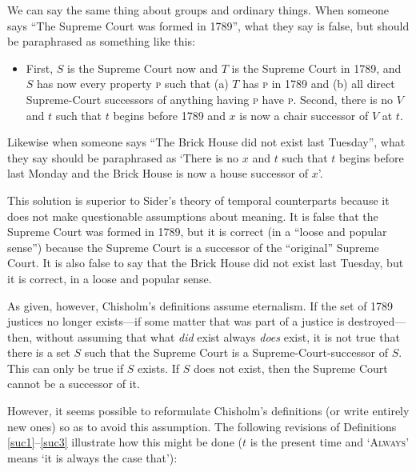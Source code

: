 \documentclass[12pt,twoside]{reedfancy}
\begin{document}
\begin{spacing}{1.25}
We can say the same thing about groups and ordinary things.  When
someone says ``The Supreme Court was formed in 1789'', what they say
is false, but should be paraphrased as something like this:

\begin{itemize}
  \item First, $S$ is the Supreme Court now and $T$ is the Supreme
    Court in 1789, and $S$ has now every property \textsc{p} such that
    (a) $T$ has \textsc{p} in 1789 and (b) all direct Supreme-Court
    successors of anything having \textsc{p} have \textsc{p}.  Second,
    there is no $V$ and $t$ such that $t$ begins before 1789 and $x$
    is now a chair successor of $V$ at $t$.
\end{itemize}

Likewise when someone says ``The Brick House did not exist last
Tuesday'', what they say should be paraphrased as `There is no $x$ and
$t$ such that $t$ begins before last Monday and the Brick House is now
a house successor of $x$'.

This solution is superior to Sider's theory of temporal counterparts
because it does not make questionable assumptions about meaning.  It
is false that the Supreme Court was formed in 1789, but it is correct
(in a ``loose and popular sense'') because the Supreme Court is a
successor of the ``original'' Supreme Court.  It is also false to say
that the Brick House did not exist last Tuesday, but it is correct, in
a loose and popular sense.

As given, however, Chisholm's definitions assume eternalism.  If the
set of 1789 justices no longer exists---if some matter that was part
of a justice is destroyed---then, without assuming that what {\em did}
exist always {\em does} exist, it is not true that there is a set $S$
such that the Supreme Court is a Supreme-Court-successor of $S$.  This
can only be true if $S$ exists.  If $S$ does not exist, then the
Supreme Court cannot be a successor of it.

However, it seems possible to reformulate Chisholm's definitions (or
write entirely new ones) so as to avoid this assumption.  The
following revisions of Definitions \ref{suc1}--\ref{suc3} illustrate
how this might be done ($t$ is the present time and `\textsc{Always}'
means `it is always the case that'):


\end{spacing}
\end{document}
